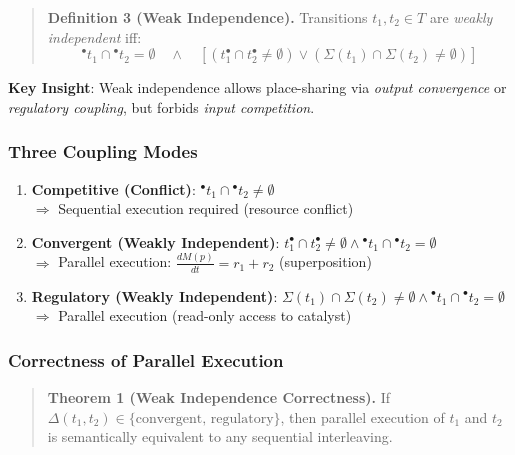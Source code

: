 \documentclass{article}
\newcommand{\preset}[1]{\ensuremath{{}^{\bullet}#1}}
\newcommand{\postset}[1]{\ensuremath{#1^{\bullet}}}
\newcommand{\RegSet}[1]{\ensuremath{\Sigma(#1)}}
\newcommand{\DepType}[2]{\ensuremath{\Delta(#1,#2)}}
\begin{document}
\begin{quote}
\textbf{Definition 3 (Weak Independence).}
Transitions $t_1, t_2 \in T$ are \emph{weakly independent} iff:
\begin{equation}
\preset{t_1} \cap \preset{t_2} = \emptyset \quad \land \quad [(\postset{t_1} \cap \postset{t_2} \neq \emptyset) \lor (\RegSet{t_1} \cap \RegSet{t_2} \neq \emptyset)]
\end{equation}
\end{quote}

\textbf{Key Insight}: Weak independence allows place-sharing via \emph{output convergence} or \emph{regulatory coupling}, but forbids \emph{input competition}.

\subsubsection{Three Coupling Modes}

\begin{enumerate}
    \item \textbf{Competitive (Conflict)}: $\preset{t_1} \cap \preset{t_2} \neq \emptyset$ \\
    $\Rightarrow$ Sequential execution required (resource conflict)
    
    \item \textbf{Convergent (Weakly Independent)}: $\postset{t_1} \cap \postset{t_2} \neq \emptyset \land \preset{t_1} \cap \preset{t_2} = \emptyset$ \\
    $\Rightarrow$ Parallel execution: $\frac{dM(p)}{dt} = r_1 + r_2$ (superposition)
    
    \item \textbf{Regulatory (Weakly Independent)}: $\RegSet{t_1} \cap \RegSet{t_2} \neq \emptyset \land \preset{t_1} \cap \preset{t_2} = \emptyset$ \\
    $\Rightarrow$ Parallel execution (read-only access to catalyst)
\end{enumerate}

\subsubsection{Correctness of Parallel Execution}

\begin{quote}
\textbf{Theorem 1 (Weak Independence Correctness).}
If $\DepType{t_1}{t_2} \in \{\text{convergent, regulatory}\}$, then parallel execution of $t_1$ and $t_2$ is semantically equivalent to any sequential interleaving.
\end{quote}
\end{document}
